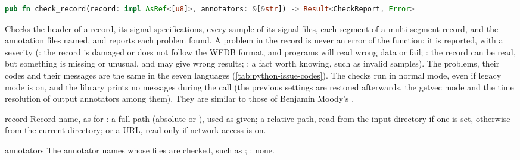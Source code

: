 \begin{lstlisting}[language=Rust,style=signature]
pub fn check_record(record: impl AsRef<[u8]>, annotators: &[&str]) -> Result<CheckReport, Error>
\end{lstlisting}
Checks the header of a record, its signal specifications, every sample of its signal
files, each segment of a multi-segment record, and the annotation files named, and
reports each problem found. A problem in the record is never an error of the function: it
is reported, with a severity (: the record is damaged or does not
follow the WFDB format, and programs will read wrong data or fail;
: the record can be read, but something is missing or unusual,
and may give wrong results; : a fact worth knowing, such as invalid
samples). The problems, their codes and their messages are the same in the seven
languages (\cref{tab:python-issue-codes}). The checks run in normal mode, even if legacy
mode is on, and the library prints no messages during the call (the previous settings
are restored afterwards, the getvec mode and the time resolution of output annotators
among them). They are similar to those of Benjamin Moody's .
\begin{params}
\item[record] Record name, as for : a full path (absolute or
  \code{\textasciitilde}), used as given; a relative path, read from the input directory
  if one is set, otherwise from the current directory; or a URL, read only if network
  access is on.
\item[annotators] The annotator names whose files are checked, such as \code{\&["atr"]};
  \code{\&[]}: none.
\end{params}
